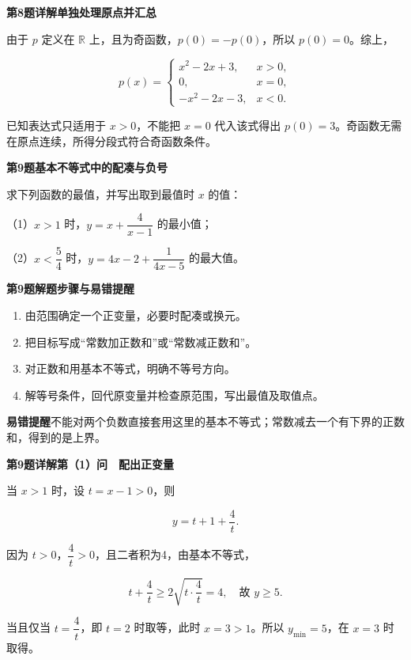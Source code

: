 \documentclass[UTF8,10pt,aspectratio=169]{ctexbeamer}
\newcommand{\PageHeading}[1]{\begin{center}{\Large\bfseries #1}\end{center}\vspace{0.12cm}}
\newcommand{\subq}[1]{\par\vspace{0.15cm}（#1）}
\begin{document}
\begin{frame}[t]
\PageHeading{第8题详解\quad 单独处理原点并汇总}
由于 $p$ 定义在 $\mathbb R$ 上，且为奇函数，$p(0)=-p(0)$，所以 $p(0)=0$。综上，
\par
\pause
\[\boxed{p(x)=\begin{cases}x^2-2x+3,&x>0,\\0,&x=0,\\-x^2-2x-3,&x<0.\end{cases}}\]
\par
已知表达式只适用于 $x>0$，不能把 $x=0$ 代入该式得出 $p(0)=3$。奇函数无需在原点连续，所得分段式符合奇函数条件。
\par
\end{frame}
\begin{frame}[t]
\PageHeading{第9题\quad 基本不等式中的配凑与负号}
求下列函数的最值，并写出取到最值时 $x$ 的值：
\subq{1}$x>1$ 时，$y=x+\dfrac4{x-1}$ 的最小值；
\subq{2}$x<\dfrac54$ 时，$y=4x-2+\dfrac1{4x-5}$ 的最大值。
\par
\end{frame}
\begin{frame}[t]
\PageHeading{第9题\quad 解题步骤与易错提醒}
\begin{enumerate}\item 由范围确定一个正变量，必要时配凑或换元。
\item 把目标写成“常数加正数和”或“常数减正数和”。
\item 对正数和用基本不等式，明确不等号方向。
\item 解等号条件，回代原变量并检查原范围，写出最值及取值点。\end{enumerate}
\par
\pause
\vspace{0.18cm}\textbf{易错提醒}\quad 不能对两个负数直接套用这里的基本不等式；常数减去一个有下界的正数和，得到的是上界。
\par
\end{frame}
\begin{frame}[t]
\PageHeading{第9题详解\quad 第（1）问　配出正变量}
当 $x>1$ 时，设 $t=x-1>0$，则
\par
\pause
\[y=t+1+\frac4t.\]
\par
因为 $t>0$，$\dfrac4t>0$，且二者积为4，由基本不等式，
\par
\[t+\frac4t\ge2\sqrt{t\cdot\frac4t}=4,\quad\text{故 }y\ge5.\]
\par
当且仅当 $t=\dfrac4t$，即 $t=2$ 时取等，此时 $x=3>1$。所以 $\boxed{y_{\min}=5}$，在 $\boxed{x=3}$ 时取得。
\par
\end{frame}
\end{document}
